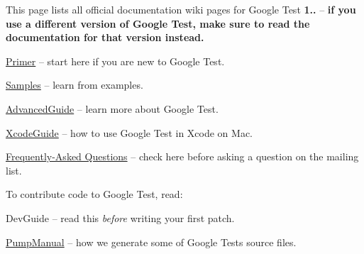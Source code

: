 This page lists all official documentation wiki pages for Google Test {\bfseries 1..} -- {\bfseries if you use a different version of Google Test, make sure to read the documentation for that version instead.}


\begin{DoxyItemize}
\item \hyperlink{_v1__5___primer_8md}{Primer} -- start here if you are new to Google Test.
\item \hyperlink{_samples_8md}{Samples} -- learn from examples.
\item \hyperlink{_v1__5___advanced_guide_8md}{Advanced\+Guide} -- learn more about Google Test.
\item \hyperlink{_v1__5___xcode_guide_8md}{Xcode\+Guide} -- how to use Google Test in Xcode on Mac.
\item \hyperlink{_v1__5___f_a_q_8md}{Frequently-\/\+Asked Questions} -- check here before asking a question on the mailing list.
\end{DoxyItemize}

To contribute code to Google Test, read\+:


\begin{DoxyItemize}
\item Dev\+Guide -- read this {\itshape before} writing your first patch.
\item \hyperlink{_v1__5___pump_manual_8md}{Pump\+Manual} -- how we generate some of Google Test\textquotesingle{}s source files. 
\end{DoxyItemize}